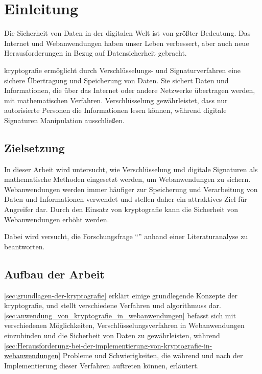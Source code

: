 \section{Einleitung}\label{sec:einleitung}
Die Sicherheit von Daten in der digitalen Welt ist von größter Bedeutung. 
Das Internet und Webanwendungen haben unser Leben verbessert, aber auch neue Herausforderungen in Bezug auf Datensicherheit gebracht.

\Gls{kryptografie} ermöglicht durch Verschlüsselungs- und Signaturverfahren eine sichere Übertragung und Speicherung von Daten.
Sie sichert Daten und Informationen, die über das Internet oder andere Netzwerke übertragen werden, mit mathematischen Verfahren. 
Verschlüsselung gewährleistet, dass nur autorisierte Personen die Informationen lesen können, während digitale Signaturen Manipulation ausschließen.


\subsection{Zielsetzung}\label{subsec:zielsetzung}
In dieser Arbeit wird untersucht, wie Verschlüsselung und digitale Signaturen als mathematische Methoden eingesetzt werden, um Webanwendungen zu sichern.
Webanwendungen werden immer häufiger zur Speicherung und Verarbeitung von Daten und Informationen verwendet und stellen daher ein attraktives Ziel für Angreifer dar.
Durch den Einsatz von \gls{kryptografie} kann die Sicherheit von Webanwendungen erhöht werden.

Dabei wird versucht, die Forschungsfrage \enquote{\myForschungsfrage} anhand einer Literaturanalyse zu beantworten.


\subsection{Aufbau der Arbeit}\label{subsec:aufbau-der-arbeit}
 \autoref{sec:grundlagen-der-kryptografie} erklärt einige grundlegende Konzepte der \gls{kryptografie}, und stellt verschiedene  Verfahren und \glspl{algorithmus} dar.
\autoref{sec:anwendung_von_kryptografie_in_webanwendungen} befasst sich mit verschiedenen Möglichkeiten, Verschlüsselungsverfahren in Webanwendungen einzubinden und die Sicherheit von Daten zu gewährleisten, während  \autoref{sec:Herausforderung-bei-der-implementierung-von-kryptografie-in-webanwendungen} Probleme und Schwierigkeiten, die während und nach der Implementierung dieser Verfahren auftreten können, erläutert.